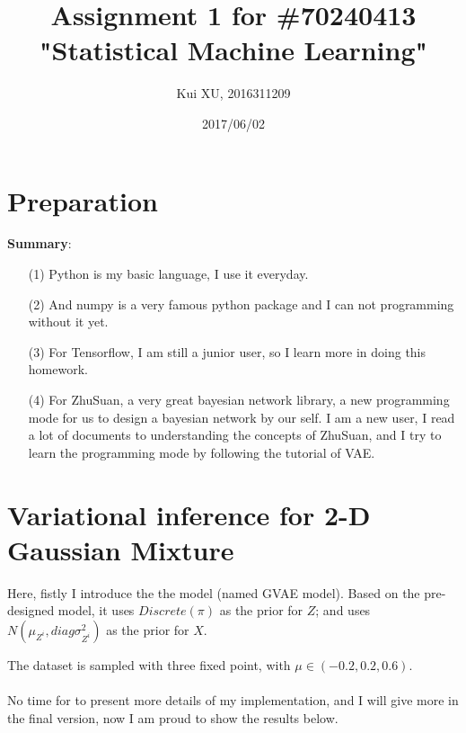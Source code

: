 \documentclass[a4paper]{article}
\title{Assignment 1 for \#70240413 \\ "Statistical Machine Learning" }
\author{Kui XU, 2016311209}
\date{2017/06/02}
\begin{document}
\maketitle

\section{Preparation}

\textbf{Summary}: 
\begin{enumerate}
\item[(1)] Python is my basic language, I use it everyday.
\item[(2)] And numpy is a very famous python package and I can not programming without it yet. 
\item[(3)] For Tensorflow, I am still a junior user, so I learn more in doing this homework.
\item[(4)] For ZhuSuan, a very great bayesian network library, a new programming mode for us to design a bayesian network by our self. I am a new user, I read a lot of documents to understanding the concepts of ZhuSuan, and I try to learn the programming mode by following the tutorial of VAE.
\end{enumerate}


\section{Variational inference for 2-D Gaussian Mixture}

Here, fistly I introduce the the model (named GVAE model). Based on the 
pre-designed model,  it uses $Discrete(\pi)$ as the prior for $Z$; and uses 
$N(\mu_{Z^{i}}, diag{\sigma_{Z^{i}}^{2}})$ as the prior for $X$.

The dataset is sampled with three fixed point, with $\mu \in (-0.2, 0.2, 0.6)$.\\ 
\\
No time for to present more details of my implementation, and I will give more in the final version, now I am proud to show the results below.
\end{document}
